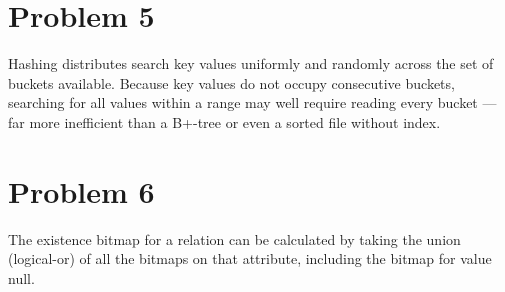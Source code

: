\documentclass[a4paper,11pt]{article}
\begin{document}
\section*{Problem 5}
Hashing distributes search key values uniformly and randomly across the set of buckets available. Because key values do not occupy consecutive buckets, searching for all values within a range may well require reading every bucket --- far more inefficient than a B+-tree or even a sorted file without index.

\section*{Problem 6}
The existence bitmap for a relation can be calculated by taking the union 
(logical-or) of all the bitmaps on that attribute, including the bitmap for 
value null. 
\end{document}

